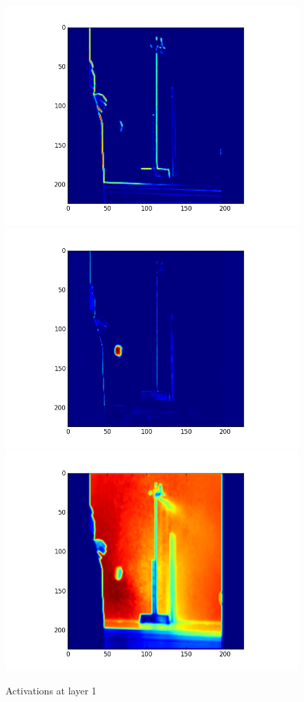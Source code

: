 \documentclass[11pt, oneside]{amsart}
\begin{document}
\begin{figure}[H]
  \includegraphics[width=\linewidth]{activation1.png}
\endminipage\hfill
{}
  \includegraphics[width=\linewidth]{activation2.png}
\endminipage\hfill
{}%
  \includegraphics[width=\linewidth]{activation3.png}
\endminipage\hfill
  \caption{Activations at layer 1}
\end{figure}
\end{document}
